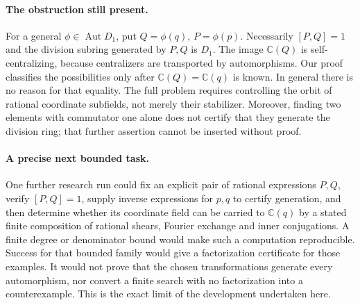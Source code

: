 \paragraph{The obstruction still present.}
For a general \(\phi\in\operatorname{Aut}D_1\), put
\(Q=\phi(q)\), \(P=\phi(p)\). Necessarily \([P,Q]=1\) and the
division subring generated by \(P,Q\) is \(D_1\). The image
\(\mathbb C(Q)\) is self-centralizing, because centralizers are transported
by automorphisms. Our proof classifies the possibilities only after
\(\mathbb C(Q)=\mathbb C(q)\) is known. In general there is no reason
for that equality. The full problem requires controlling the orbit of
rational coordinate subfields, not merely their stabilizer. Moreover,
finding two elements with commutator one alone does not certify that they
generate the division ring; that further assertion cannot be inserted
without proof.

\paragraph{A precise next bounded task.}
One further research run could fix an explicit pair of rational
expressions \(P,Q\), verify \([P,Q]=1\), supply inverse expressions for
\(p,q\) to certify generation, and then determine whether its coordinate
field can be carried to \(\mathbb C(q)\) by a stated finite composition
of rational shears, Fourier exchange and inner conjugations. A finite
degree or denominator bound would make such a computation reproducible.
Success for that bounded family would give a factorization certificate
for those examples. It would not prove that the chosen transformations
generate every automorphism, nor convert a finite search with no
factorization into a counterexample. This is the exact limit of the
development undertaken here.
